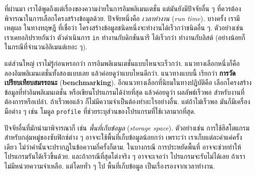 ที่ผ่านมา เราได้พูดถึงแต่เรื่องของความง่ายในการอิมพลิเมนเตชั่น
แต่มันยังมีปัจจัยอื่น ๆ ที่ควรต้องพิจารณาในการเลือกโครงสร้างข้อมูลด้วย.
ปัจจัยหนึ่งคือ \textit{เวลาทำงาน} (\textit{run time}).
บางครั้ง เรามีเหตุผล ในทางทฤษฎี ที่เชื่อว่า โครงสร้างข้อมูลชนิดหนึ่งจะทำงานได้เร็วกว่าชนิดอื่น ๆ.
ตัวอย่างเช่น เราเคยอภิปรายกันว่า ตัวดำเนินการ \texttt{in} ทำงานกับดิกชันนารี ได้เร็วกว่า ทำงานกับลิสต์
(อย่างน้อยก็ในกรณีที่จำนวนอิลิเมนต์เยอะ ๆ).


แต่ส่วนใหญ่ เราไม่รู้ก่อนหรอกว่า การอิมพลิเมนเตชั่นแบบไหนจะเร็วกว่า.
แนวทางเลือกหนึ่งก็คือ ลองอิมพลิเมนเตชั่นทั้งสองแบบเลย แล้วค่อยดูว่าแบบไหนดีกว่า.
แนวทางแบบนี้ เรียกว่า \textbf{การวัดเปรียบเทียบสมรรถนะ} (\textbf{benchmarking}).
อีกแนวทางเลือกที่นิยมในทางปฏิบัติคือ เลือกโครงสร้างข้อมูลที่ทำอิมพลิเมนเตชั่น หรือเขียนโปรแกรมได้ง่ายที่สุด 
แล้วค่อยดูว่า ผลลัพธ์เร็วพอ สำหรับงานที่ต้องการหรือเปล่า.
ถ้าเร็วพอแล้ว ก็ไม่มีความจำเป็นต้องทำอะไรอย่างอื่น.
แต่ถ้าไม่เร็วพอ มันก็มีเครื่องมือต่าง ๆ เช่น โมดูล \texttt{profile} ที่ช่วยระบุส่วนของโปรแกรมที่ใช้เวลามากที่สุด.


ปัจจัยอื่นที่มักนำมาพิจารณาก็ เช่น \textit{พื้นที่เก็บข้อมูล} (\textit{storage space}).
ตัวอย่างเช่น การใช้ฮิสโตแกรม สำหรับกลุ่มหมู่ของซับฟิกซ์ต่าง ๆ อาจจะใช้พื้นที่เก็บข้อมูลน้อยกว่า
เพราะว่า เราเก็บแต่ละคำแค่ครั้งเดียว ไม่ว่าคำนั้นจะปรากฎในข้อความกี่ครั้งก็ตาม.
ในบางกรณี การประหยัดพื้นที่ อาจจะช่วยทำให้โปรแกรมรันได้เร็วขึ้นด้วย.
และถ้ากรณีที่สุดโต่งจริง ๆ อาจจะเจอว่า โปรแกรมจะรับไม่ได้เลย ถ้าเราไม่มีหน่วยความจำเหลือ.
แต่โดยทั่ว ๆ ไป พื้นที่เก็บข้อมูล เป็นเรื่องรองจากเวลาทำงาน.

